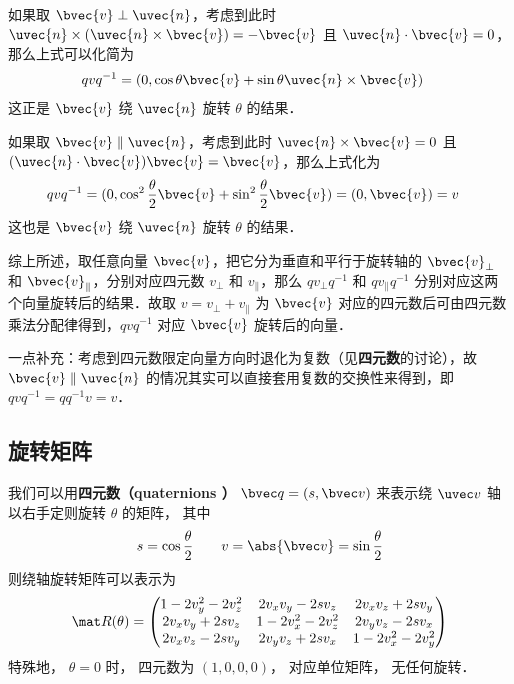 如果取 $\bvec{v}\perp{\uvec{n}}$，考虑到此时 ${\uvec{n}}\times({\uvec{n}}\times\bvec{v})=-\bvec{v}$ 且 ${\uvec{n}}\cdot\bvec{v}=0$，那么上式可以化简为
\begin{equation}
\begin{aligned}
qvq^{-1}&=(0, \cos\theta\bvec{v}+\sin\theta{\uvec{n}}\times\bvec{v})
\end{aligned}
\end{equation}
这正是 $\bvec{v}$ 绕 ${\uvec{n}}$ 旋转 $\theta$ 的结果．

如果取 $\bvec{v}\parallel{\uvec{n}}$，考虑到此时 ${\uvec{n}}\times\bvec{v}=0$ 且 $({\uvec{n}}\cdot\bvec{v})\bvec{v}=\bvec{v}$，那么上式化为
\begin{equation}
\begin{aligned}
qvq^{-1}&=(0, \cos^2\frac{\theta}{2}\bvec{v}+\sin^2\frac{\theta}{2}\bvec{v})=(0, \bvec{v})=v
\end{aligned}
\end{equation}
这也是 $\bvec{v}$ 绕 ${\uvec{n}}$ 旋转 $\theta$ 的结果．

综上所述，取任意向量 $\bvec{v}$，把它分为垂直和平行于旋转轴的 $\bvec{v}_\perp$ 和 $\bvec{v}_\parallel$，分别对应四元数 $v_\perp$ 和 $v_\parallel$，那么 $q v_\perp q^{-1}$ 和 $q v_\parallel q^{-1}$ 分别对应这两个向量旋转后的结果．故取 $v=v_\perp+v_\parallel$ 为 $\bvec{v}$ 对应的四元数后可由四元数乘法分配律得到，$qvq^{-1}$ 对应 $\bvec{v}$ 旋转后的向量．

一点补充：考虑到四元数限定向量方向时退化为复数（见\textbf{四元数}的讨论），故 $\bvec{v}\parallel{\uvec{n}}$ 的情况其实可以直接套用复数的交换性来得到，即 $qvq^{-1}=qq^{-1}v=v$．


\subsection{旋转矩阵}
我们可以用\textbf{四元数（quaternions ）} $\bvec q = (s, \bvec v)$ 来表示绕 $\uvec v$ 轴以右手定则旋转 $\theta$ 的矩阵， 其中
\begin{equation}
s = \cos\frac{\theta}{2} \qquad
v = \abs{\bvec v} = \sin\frac{\theta}{2}
\end{equation}
则绕轴旋转矩阵可以表示为
\begin{equation}\label{QuatN_eq2}
\mat R(\theta) =
\begin{pmatrix}
1 - 2v_y^2 - 2v_z^2 & 2v_xv_y - 2sv_z  & 2v_x v_z + 2s v_y\\
2v_x v_y + 2sv_z & 1 - 2v_x^2 - 2v_z^2 & 2v_y v_z - 2s v_x\\
2v_x v_z - 2s v_y & 2v_y v_z + 2s v_x & 1 - 2v_x^2 - 2v_y^2
\end{pmatrix}
\end{equation}
特殊地， $\theta = 0$ 时， 四元数为 $(1,0,0,0)$， 对应单位矩阵， 无任何旋转．

